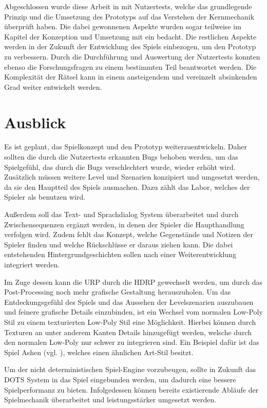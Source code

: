 Abgeschlossen wurde diese Arbeit in  mit Nutzertests, welche das grundlegende Prinzip und die Umsetzung des Prototyps auf das Verstehen der Kernmechanik überprüft haben. Die dabei gewonnenen Aspekte wurden sogar teilweise im Kapitel der Konzeption und Umsetzung mit ein bedacht. Die restlichen Aspekte werden in der Zukunft der Entwicklung des Spiels einbezogen, um den Prototyp zu verbessern. Durch die Durchführung und Auswertung der Nutzertests konnten ebenso die Forschungsfragen zu einem bestimmten Teil beantwortet werden. Die Komplexität der Rätsel kann in einem ansteigendem und vereinzelt absinkenden Grad weiter entwickelt werden.

\section{Ausblick}\label{sec:ausblick}
Es ist geplant, das Spielkonzept und den Prototyp weiterzuentwickeln. Daher sollten die durch die Nutzertests erkannten Bugs behoben werden, um das Spielgefühl, das durch die Bugs verschlechtert wurde, wieder erhöht wird.
Zusätzlich müssen weitere Level und Szenarien konzipiert und umgesetzt werden, da sie den Hauptteil des Spiels ausmachen. Dazu zählt das Labor, welches der Spieler als  benutzen wird.

Außerdem soll das Text- und Sprachdialog System überarbeitet und durch Zwischensequenzen ergänzt werden, in denen der Spieler die Haupthandlung verfolgen wird. Zudem fehlt das Konzept, welche Gegenstände und Notizen der Spieler finden und welche Rückschlüsse er daraus ziehen kann. Die dabei entstehenden Hintergrundgeschichten sollen nach einer Weiterentwicklung integriert werden.

Im Zuge dessen kann die \ac{URP} durch die \ac{HDRP} gewechselt werden, um durch das Post-Processing noch mehr grafische Gestaltung herauszuholen. Um das Entdeckungsgefühl des Spiels und das Aussehen der Levelszenarien auszubauen und feinere grafische Details einzubinden, ist ein Wechsel vom normalen Low-Poly Stil zu einem texturierten Low-Poly Stil eine Möglichkeit. Hierbei können durch Texturen an unter anderem Kanten Details hinzugefügt werden, welsche durch den normalen Low-Poly nur schwer zu integrieren sind. Ein Beispiel dafür ist das Spiel Ashen (vgl. \cite{gamestar_ashen_2023}), welches einen ähnlichen Art-Stil besitzt.

Um der nicht deterministischen Spiel-Engine vorzubeugen, sollte in Zukunft das \ac{DOTS} System in das Spiel eingebunden werden, um dadurch eine bessere Spielperformanz zu bieten. Infolgedessen können bereits existierende Abläufe der Spielmechanik überarbeitet und leistungsstärker umgesetzt werden.

